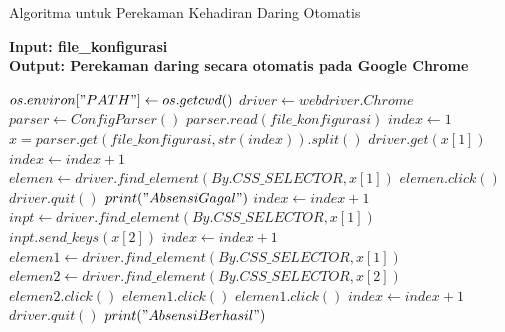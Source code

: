 \begin{algorithm}
	\caption{Algoritma untuk Perekaman Kehadiran Daring Otomatis}\label{euclid}
	\hspace*{\algorithmicindent} \textbf{Input: file\_konfigurasi} \\
	\hspace*{\algorithmicindent} \textbf{Output: Perekaman daring secara otomatis pada Google Chrome} 
	\begin{algorithmic}[1]
	\State $os.environ["PATH"] \gets os.getcwd()$
	\State $driver \gets webdriver.Chrome$
	\State $parser \gets ConfigParser()$
	\State $parser.read(file\_konfigurasi)$
	\State $index \gets 1$
	\State $x = parser.get(file\_konfigurasi, str(index)).split()$
	\State $driver.get(x[1])$
	\State $index \gets index + 1$
	\State $elemen \gets driver.find\_element(By.CSS\_SELECTOR, x[1])$
	\State $elemen.click()$
	\Else 
	\State $driver.quit()$
	\State $print ("Absensi Gagal")$
	\State $index \gets index + 1$
	\EndIf
	\State $inpt \gets driver.find\_element(By.CSS\_SELECTOR, x[1])$
	\State $inpt.send\_keys(x[2])$
	\State $index \gets index + 1$
	\State $elemen1 \gets driver.find\_element(By.CSS\_SELECTOR, x[1])$
	\State $elemen2 \gets driver.find\_element(By.CSS\_SELECTOR, x[2])$
	\State $elemen2.click()$
	\State $elemen1.click()$
	\Else
	\State $elemen1.click()$
	\State $index \gets index + 1$
	\EndIf
	\State $driver.quit() $  
	\State $print ("Absensi Berhasil")$
	\EndIf
	\EndWhile
	\end{algorithmic}
\end{algorithm}